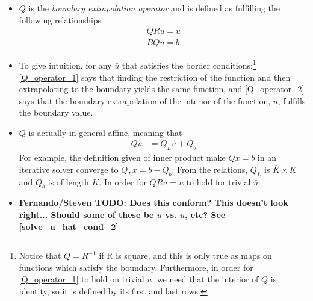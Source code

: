 \documentclass[11pt]{article}
\begin{document}
\begin{itemize}
		\item $Q$ is the \textit{boundary extrapolation operator} and is defined as fulfilling the following relationships
		\begin{align}
		Q  R\bar{u} = \bar{u}\label{Q_operator_1}\\
		B Q u  = b	\label{Q_operator_2}
	\end{align}
	\item To give intuition, for any $\bar{u}$ that satisfies the border conditions:\footnote{Notice that $Q = R^{-1}$ if R is square, and this is only true as maps on functions which satisfy the boundary.  Furthermore, in order for \cref{Q_operator_1} to hold on trivial $u$, we need that the interior of $Q$ is identity, so it is defined by its first and last rows.} \cref{Q_operator_1} says that finding the restriction of the function and then extrapolating to the boundary yields the same function, and \cref{Q_operator_2} says that the boundary extrapolation of the interior of the function, $u$, fulfills the boundary value.
		\item $Q$ is actually in general affine, meaning that
		\begin{align}
			Q u &= Q_L u + Q_b\label{Q_Affine}
			\end{align}
			For example, the definition given of inner product make $Q x=b$ in an iterative solver converge to $Q_L x = b - Q_b$. From the relations, $Q_L$ is $\bar{K}\times K$ and $Q_b$ is of length $\bar{K}$. In order for $Q R u = u$ to hold for trivial $\bar{u}$
			\item \textbf{Fernando/Steven TODO: Does this conform? This doesn't look right...  Should some of these be $u$ vs. $\bar{u}$, etc?  See \cref{solve_u_hat_cond_2}}
		\end{itemize}
\end{document}
